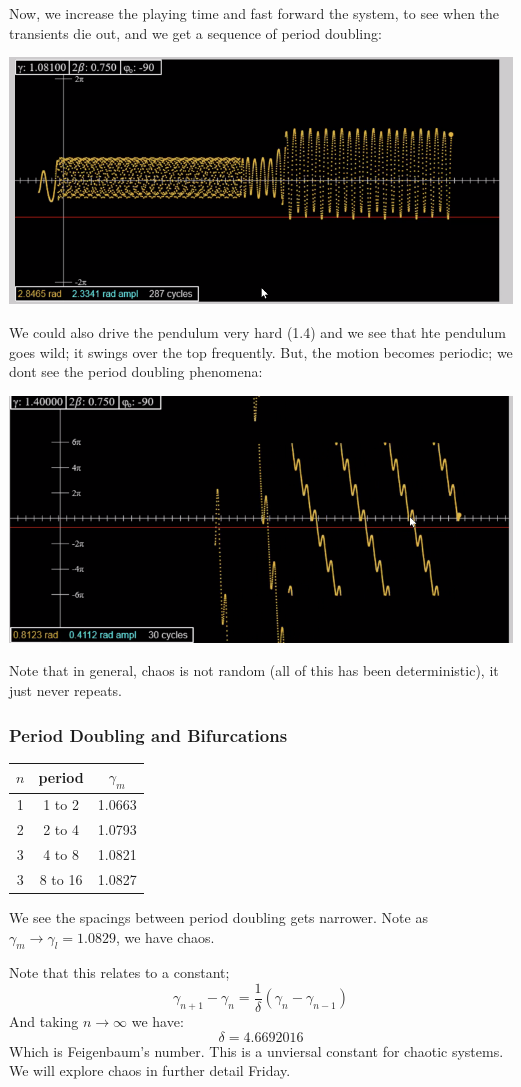 \documentclass[../PHYS306Notes.tex]{subfiles}
\begin{document}
Now, we increase the playing time and fast forward the system, to see when the transients die out, and we get a sequence of period doubling:
\begin{center}
    \includegraphics[scale=0.5]{Lecture-32/l32-img7.png}
\end{center}
We could also drive the pendulum very hard (1.4) and we see that hte pendulum goes wild; it swings over the top frequently. But, the motion becomes periodic; we dont see the period doubling phenomena:
\begin{center}
    \includegraphics[scale=0.5]{Lecture-32/l32-img8.png}
\end{center}
Note that in general, chaos is not random (all of this has been deterministic), it just never repeats.

\subsubsection{Period Doubling and Bifurcations}
\begin{center}
\begin{tabular}{c|c|c}
    $n$ & period & $\gamma_m$ \\ 
    \hline
    1 & 1 to 2 & 1.0663 \\
    2 & 2 to 4 & 1.0793 \\
    3 & 4 to 8 & 1.0821 \\
    3 & 8 to 16 & 1.0827 \\
\end{tabular}
\end{center}

We see the spacings between period doubling gets narrower. Note as $\gamma_m \rightarrow \gamma_l = 1.0829$, we have chaos.

Note that this relates to a constant;
\[\gamma_{n+1} - \gamma_n = \frac{1}{\delta}(\gamma_n - \gamma_{n-1})\]
And taking $n \rightarrow \infty$ we have:
\[\delta = 4.6692016\]
Which is Feigenbaum's number. This is a unviersal constant for chaotic systems. We will explore chaos in further detail Friday.
\end{document}
